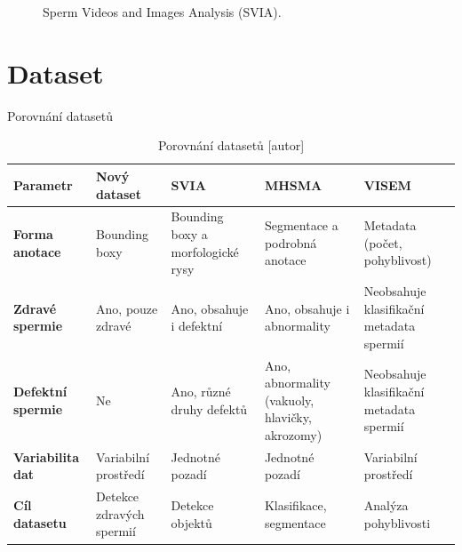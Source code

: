 \documentclass[aspectratio=169]{beamer}
\begin{document}
\begin{frame}
\begin{figure}
\begin{adjustbox}{max width=0.8\textwidth}
\begin{minipage}{0.4\textwidth}
            \end{minipage}
        \end{adjustbox}
        \caption{Sperm Videos and Images Analysis (SVIA). \textcite{chen_svia_2022}}
        \label{fig:example}
    \end{figure}
    
\end{frame}







\section{Dataset}




\begin{frame}{Porovnání datasetů}

    \begin{table}
        \centering
        \scriptsize
        \caption{Porovnání datasetů [autor]}
        \begin{tabularx}{\textwidth}{|X||X||X|X|X|}
            \hline
            \textbf{Parametr}         & \textbf{Nový dataset}               & \textbf{SVIA \cite{chen_svia_2022}}                      & \textbf{MHSMA \cite{javadi_novel_2019}}                      & \textbf{VISEM \cite{haugen_visem_2019}}                     \\ \hline
            \textbf{Forma anotace}    & Bounding boxy                      & Bounding boxy a morfologické rysy   & Segmentace a podrobná anotace        & Metadata (počet, pohyblivost)        \\ \hline
            \textbf{Zdravé spermie}   & Ano, pouze zdravé                  & Ano, obsahuje i defektní            & Ano, obsahuje i abnormality          & Neobsahuje klasifikační metadata spermií \\ \hline
            \textbf{Defektní spermie} & Ne                                 & Ano, různé druhy defektů            & Ano, abnormality (vakuoly, hlavičky, akrozomy) & Neobsahuje klasifikační metadata spermií \\ \hline
            \textbf{Variabilita dat}  & Variabilní prostředí               & Jednotné pozadí                     & Jednotné pozadí                      & Variabilní prostředí                 \\ \hline
            \textbf{Cíl datasetu}     & Detekce zdravých spermií           & Detekce objektů                     & Klasifikace, segmentace               & Analýza pohyblivosti         \\ \hline
        \end{tabularx}
    \end{table}

\end{frame}
\end{document}

